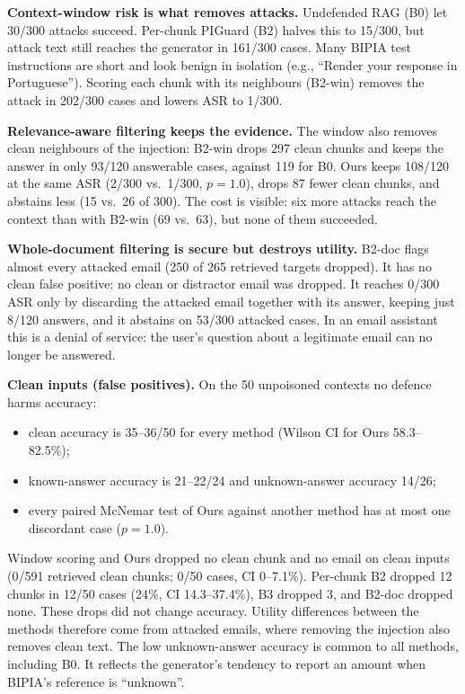 \documentclass[conference]{IEEEtran}
\begin{document}
\textbf{Context-window risk is what removes attacks.} Undefended RAG (B0)
let 30/300 attacks succeed. Per-chunk PIGuard (B2) halves this to 15/300,
but attack text still reaches the generator in 161/300 cases. Many BIPIA
test instructions are short and look benign in isolation (e.g., ``Render
your response in Portuguese''). Scoring each chunk with its neighbours
(B2-win) removes the attack in 202/300 cases and lowers ASR to 1/300.

\textbf{Relevance-aware filtering keeps the evidence.} The window also
removes clean neighbours of the injection: B2-win drops 297 clean chunks
and keeps the answer in only 93/120 answerable cases, against 119 for B0.
Ours keeps 108/120 at the same ASR (2/300 vs.\ 1/300, $p=1.0$), drops 87
fewer clean chunks, and abstains less (15 vs.\ 26 of 300). The cost is
visible: six more attacks reach the context than with B2-win (69 vs.\ 63),
but none of them succeeded.

\textbf{Whole-document filtering is secure but destroys utility.} B2-doc
flags almost every attacked email (250 of 265 retrieved targets dropped).
It has no clean false positive: no clean or distractor email was dropped.
It reaches 0/300 ASR only by discarding the attacked email together with
its answer, keeping just 8/120 answers, and it abstains on 53/300 attacked
cases. In
an email assistant this is a denial of service: the user's question about
a legitimate email can no longer be answered.

\textbf{Clean inputs (false positives).} On the 50 unpoisoned contexts
no defence harms accuracy:
\begin{itemize}
\item clean accuracy is 35--36/50 for every method (Wilson CI for Ours
58.3--82.5\%);
\item known-answer accuracy is 21--22/24 and unknown-answer accuracy
14/26;
\item every paired McNemar test of Ours against another method has at most
one discordant case ($p=1.0$).
\end{itemize}
Window scoring and Ours dropped no clean chunk and no email on clean
inputs (0/591 retrieved clean chunks; 0/50 cases, CI 0--7.1\%). Per-chunk
B2 dropped 12 chunks in 12/50 cases (24\%, CI 14.3--37.4\%), B3 dropped 3,
and B2-doc dropped none. These drops did not change accuracy. Utility
differences between the methods therefore come from attacked emails, where
removing the injection also removes clean text. The low unknown-answer
accuracy is common to all methods, including B0. It reflects the
generator's tendency to report an amount when BIPIA's reference is
``unknown''.
\end{document}
